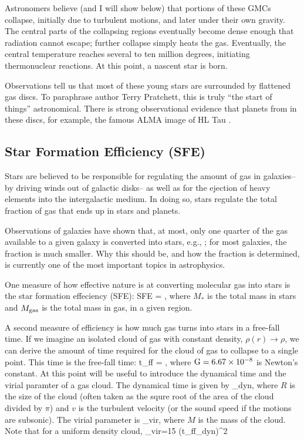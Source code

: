 \documentclass[../dissertation.tex]{subfiles}
\begin{document}
Astronomers believe (and I will show below) that portions of these
GMCs collapse, initially due to turbulent motions, and later under
their own gravity.  The central parts of the collapsing regions
eventually become dense enough that radiation cannot escape; further
collapse simply heats the gas.  Eventually, the central temperature reaches
several to ten million degrees, initiating thermonuclear reactions.
At this point, a nascent star is born.

Observations tell us that most of these young stars are surrounded by flattened gas discs. 
To paraphrase author Terry Pratchett, this is truly ``the start of things'' astronomical. 
There is strong observational evidence that planets from in these discs, for example, the famous ALMA image of HL Tau \citep{2015ApJ...808L...3A}.


\subsection{Star Formation Efficiency (SFE)}
Stars are believed to be responsible for regulating the amount of gas in galaxies--by driving winds out of galactic disks-- as well as for the ejection of heavy elements into the intergalactic
medium. In doing so, stars regulate the total fraction of gas that ends up in stars and planets. 
 
Observations of galaxies have shown that, at most, only one quarter of the gas available to a given galaxy is converted into stars, e.g., \citet{2010ApJ...708L..14M}; for most galaxies, the fraction is much smaller. 
Why this should be, and how the fraction is determined, is currently one of the most important topics in astrophysics.

One measure of how effective nature is at converting molecular gas into stars is the star formation effeciency (SFE):
%
\be
{\rm SFE} = ,
\ee
%
where $M_*$ is the total mass in stars and $M_{\rm gas}$ is the total mass in gas, in a given region.

A second measure of efficiency is how much gas turns into stars in a free-fall time. If we imagine an isolated cloud of gas with constant density, $\rho(r) \rightarrow \rho$, we can derive the amount of time required for the cloud of gas to collapse to a single point.
This time is the free-fall time:
%
\be
t_{\rm ff} = ,
\ee
%
where $ {\rm G} = 6.67 \times 10^{-8} $ is Newton's constant. At this point will be useful to introduce the dynamical time and the virial paramter of a gas cloud. The dynamical time is given by
%
\be
\tau_{\rm dyn},
\ee
%
where $R$ is the size of the cloud (often taken as the squre root of the area of the cloud divided by $\pi$) and $v$ is the turbulent velocity (or the sound speed if the motions are subsonic). The virial parameter is
%
\be
\alpha_{\rm vir},
\ee
%
where $M$ is the mass of the cloud. Note that for a uniform density cloud,
%
\be
\alpha_{\rm vir}={15\pi} \left({t_{\rm ff}\over \tau_{\rm dyn}}\right)^2
\ee
%
\end{document}
